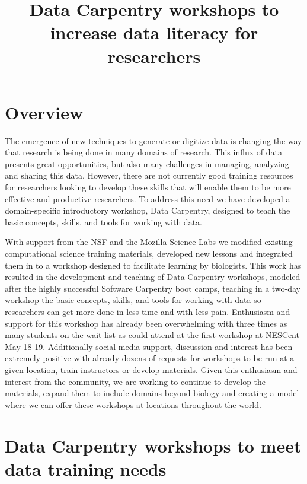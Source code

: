 \documentclass[11pt]{article}
\begin{document}
\title{Data Carpentry workshops to increase data literacy for researchers}
\date{}
\maketitle

\section{Overview }
The emergence of new techniques to generate or digitize data is changing the way that research is being done in many domains of research. This influx of data presents great opportunities, but also many challenges in managing, analyzing and sharing this data. However, there are not currently good training resources for researchers looking to develop these skills that will enable them to be more effective and productive researchers. To address this need we have developed a domain-specific introductory workshop, Data Carpentry, designed to teach the basic concepts, skills, and tools for working with data. 

With support from the NSF and the Mozilla Science Labs we modified existing computational science training materials, developed new lessons and integrated them in to a workshop designed to facilitate learning by biologists. 
This work has resulted in the development and teaching of  Data Carpentry workshops, modeled after the highly successful Software Carpentry boot camps, teaching in a  two-day workshop the basic concepts, skills, and tools for working with data so researchers can get more done in less time and with less pain. Enthusiasm and support for this workshop has already been overwhelming with three times as many students on the wait list as could attend at the first workshop at NESCent May 18-19. Additionally social media support, discussion and interest has been extremely positive with already dozens of requests for workshops to be run at a given location, train instructors or develop materials. Given this enthusiasm and interest from the community, we are working to continue to develop the materials, expand them to include domains beyond biology and creating a model where we can offer these workshops at locations throughout the world.


\section{Data Carpentry workshops to meet data training needs}
\end{document}
